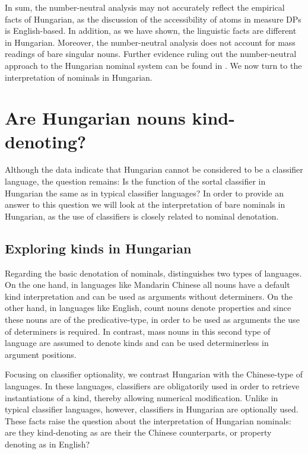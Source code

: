 \documentclass[output=paper]{langscibook}
\begin{document}
\noindent In sum, the number-neutral analysis may not accurately reflect the empirical facts of Hungarian, as the discussion of the accessibility of atoms in measure DPs is English-based. In addition, as we have shown, the linguistic facts are different in Hungarian. Moreover, the  number-neutral analysis does not account for mass readings of bare singular nouns. Further evidence ruling out the number-neutral approach to the Hungarian nominal system can be found in \citet{schvarcz-nemes-19}.  We now turn to the interpretation of nominals in Hungarian. 

\section{Are Hungarian nouns kind-denoting?} \label{schv-nem:sec:4}

Although the data indicate that Hungarian cannot be considered to be a classifier language, the question remains: Is the function of the sortal classifier in Hungarian the same as in typical classifier languages? In order to provide an answer to this question we will look at the interpretation of bare nominals in Hungarian, as the use of classifiers is closely related to nominal denotation. 

\subsection{Exploring kinds in Hungarian} \label{schv-nem:sec:4.1}

Regarding the basic denotation of nominals, \citet{chierchia-98b} distinguishes two types of languages. On the one hand, in languages like Mandarin Chinese all nouns have a default kind interpretation and can be used as arguments without determiners. On the other hand, in languages like English, count nouns denote properties and since these nouns are of the predicative-type, in order to be used as arguments the use of determiners is required. In contrast, mass nouns in this second type of language are assumed to denote kinds and can be used determinerless in argument positions.  

Focusing on classifier optionality, we contrast Hungarian with the Chinese-type of languages. In these languages, classifiers are obligatorily used in order to retrieve instantiations of a kind, thereby allowing numerical modification. Unlike in typical classifier languages, however, classifiers in Hungarian are optionally used. These facts raise the question about the interpretation of Hungarian nominals: are they kind-denoting as are their the Chinese counterparts, or property denoting as in English?
\end{document}
